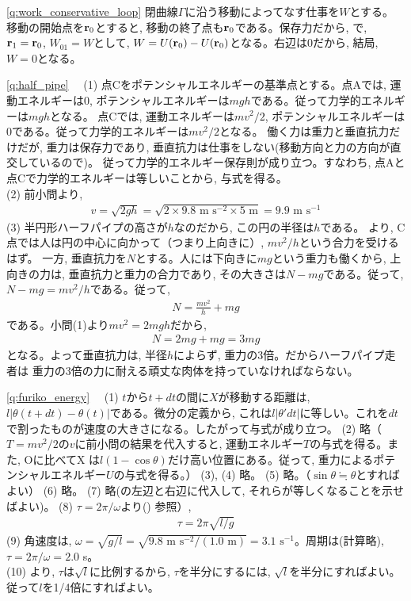\ref{q:work_conservative_loop}
閉曲線$\Gamma$に沿う移動によってなす仕事を$W$とする。
移動の開始点を${\bf r}_0$とすると, 移動の終了点も${\bf r}_0$である。保存力だから, 
で, ${\bf r}_1={\bf r}_0$, $W_{01}=W$として, 
$W=U({\bf r}_0)-U({\bf r}_0)$となる。右辺は0だから, 結局, $W=0$となる。\mv


\ref{q:half_pipe}　
(1) 点Cをポテンシャルエネルギーの基準点とする。点Aでは, 運動エネルギーは0, 
ポテンシャルエネルギーは$mgh$である。従って力学的エネルギーは$mgh$となる。
点Cでは, 運動エネルギーは$mv^2/2$, ポテンシャルエネルギーは0である。従って力学的エネルギーは$mv^2/2$となる。
働く力は重力と垂直抗力だけだが, 重力は保存力であり, 垂直抗力は仕事をしない(移動方向と力の方向が直交しているので)。
従って力学的エネルギー保存則が成り立つ。すなわち, 点Aと点Cで力学的エネルギーは等しいことから, 与式を得る。\\
(2) 前小問より,
\begin{eqnarray*}
v=\sqrt{2gh}=\sqrt{2\times9.8\text{ m s}^{-2}\times5\text{ m}}=9.9\text{ m s}^{-1}
\end{eqnarray*}
(3) 半円形ハーフパイプの高さが$h$なのだから, この円の半径は$h$である。
より, C点では人は円の中心に向かって（つまり上向きに）, 
$mv^2/h$という合力を受けるはず。
一方, 垂直抗力を$N$とする。人には下向きに$mg$という重力も働くから, 
上向きの力は, 垂直抗力と重力の合力であり, その大きさは$N-mg$である。従って, 
$N-mg=mv^2/h$である。従って, 
\begin{eqnarray}N=\frac{mv^2}{h}+mg\end{eqnarray}
である。小問(1)より$mv^2=2mgh$だから, 
\begin{eqnarray}N=2mg+mg=3mg\end{eqnarray}
となる。よって垂直抗力は, 半径$h$によらず, 重力の3倍。だからハーフパイプ走者は
重力の3倍の力に耐える頑丈な肉体を持っていなければならない。
\mv

\ref{q:furiko_energy}　
(1) $t$から$t+dt$の間に$X$が移動する距離は, \\
$l|\theta(t+dt)-\theta(t)|$である。微分の定義から, 
これは$l|\theta'dt|$に等しい。これを$dt$で割ったものが速度の大きさになる。したがって与式が成り立つ。
(2) 略（$T=mv^2/2$の$v$に前小問の結果を代入すると, 運動エネルギー$T$の与式を得る。また, Oに比べてX
は$l(1-\cos\theta)$だけ高い位置にある。従って, 重力によるポテンシャルエネルギー$U$の与式を得る。）
(3), (4) 略。
(5) 略。（$\sin \theta \fallingdotseq \theta$とすればよい）
(6) 略。
(7) 略(の左辺と右辺に代入して, それらが等しくなることを示せばよい)。
(8) $\tau=2\pi/\omega$より() 参照）, 
\begin{eqnarray}\tau=2\pi\sqrt{l/g}\label{eq:furiko_energy_ans5}\end{eqnarray}
(9) 角速度は, $\omega=\sqrt{g/l}=\sqrt{9.8\text{ m s}^{-2}/(1.0\text{ m})}=3.1\text{ s}^{-1}$。周期は(計算略), $\tau=2\pi/\omega=2.0$ s。\\
(10) より, $\tau$は$\sqrt{l}$に比例するから, $\tau$を半分にするには, $\sqrt{l}$を半分にすればよい。従って$l$を1/4倍にすればよい。
\mv

